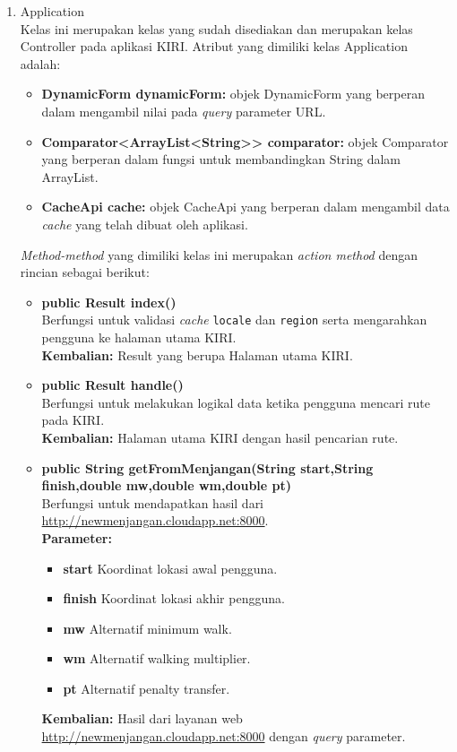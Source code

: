 \begin{enumerate}
	\item Application\\
	Kelas ini merupakan kelas yang sudah disediakan \play dan merupakan kelas Controller pada aplikasi KIRI. Atribut yang dimiliki kelas Application adalah:
	\begin{itemize}
		\item \textbf{DynamicForm dynamicForm:} objek DynamicForm yang berperan dalam mengambil nilai pada \textit{query} parameter URL. 
		\item \textbf{Comparator<ArrayList<String>{}> comparator:} objek Comparator yang berperan dalam fungsi untuk membandingkan String dalam ArrayList.
		\item \textbf{CacheApi cache:} objek CacheApi yang berperan dalam mengambil data \textit{cache} yang telah dibuat oleh aplikasi.
		
	\end{itemize}
	\textit{Method-method} yang dimiliki kelas ini merupakan \textit{action method} dengan rincian sebagai berikut:
	\begin{itemize}
		\item \textbf{public Result index()}\\
		Berfungsi untuk validasi \textit{cache} \verb!locale! dan \verb!region! serta mengarahkan pengguna ke halaman utama KIRI.\\
		\textbf{Kembalian:}  Result yang berupa Halaman utama KIRI.
		
		\item \textbf{public Result handle()}\\
		Berfungsi untuk melakukan logikal data ketika pengguna mencari rute pada KIRI.\\
		\textbf{Kembalian:}  Halaman utama KIRI dengan hasil pencarian rute.
		
		\item \textbf{public String getFromMenjangan(String start,String finish,double mw,double wm,double pt)}\\
		Berfungsi untuk mendapatkan hasil dari \url{http://newmenjangan.cloudapp.net:8000}.\\
		\textbf{Parameter:}
				\begin{itemize}
					\item \textbf{start} Koordinat lokasi awal pengguna.
					\item \textbf{finish} Koordinat lokasi akhir pengguna.
					\item \textbf{mw} Alternatif minimum walk.
					\item \textbf{wm} Alternatif walking multiplier.
					\item \textbf{pt} Alternatif penalty transfer.
				\end{itemize}
		\textbf{Kembalian:}  Hasil dari layanan web \url{http://newmenjangan.cloudapp.net:8000} dengan \textit{query} parameter.
		

\end{itemize}
\end{enumerate}
